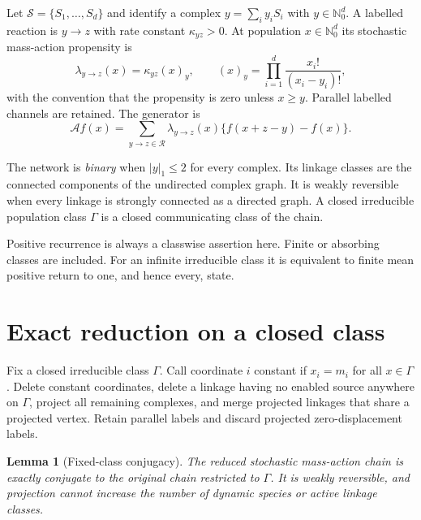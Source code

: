 \documentclass[11pt]{article}
\newtheorem{lemma}[theorem]{Lemma}
\theoremstyle{definition}
\theoremstyle{remark}
\newcommand{\N}{\mathbb N_0}
\newcommand{\cA}{\mathcal A}
\newcommand{\cR}{\mathcal R}
\newcommand{\cS}{\mathcal S}
\newcommand{\1}{\mathbf 1}
\begin{document}
Let $\cS=\{S_1,\ldots,S_d\}$ and identify a complex
$y=\sum_i y_iS_i$ with $y\in\N^d$.  A labelled reaction is $y\to z$ with
rate constant $\kappa_{yz}>0$.  At population $x\in\N^d$ its stochastic
mass-action propensity is
\begin{equation}\label{eq:propensity}
 \lambda_{y\to z}(x)=\kappa_{yz}(x)_y,
 \qquad
 (x)_y=\prod_{i=1}^d\frac{x_i!}{(x_i-y_i)!},
\end{equation}
with the convention that the propensity is zero unless $x\ge y$.
Parallel labelled channels are retained.  The generator is
\begin{equation}\label{eq:generator}
 \cA f(x)=\sum_{y\to z\in\cR}
       \lambda_{y\to z}(x)\{f(x+z-y)-f(x)\}.
\end{equation}

The network is \emph{binary} when $|y|_1\le2$ for every complex.  Its
linkage classes are the connected components of the undirected complex graph.
It is weakly reversible when every linkage is strongly connected as a
directed graph.  A closed irreducible population class $\Gamma$ is a closed
communicating class of the chain.

Positive recurrence is always a classwise assertion here.  Finite or
absorbing classes are included.  For an infinite irreducible class it is
equivalent to finite mean positive return to one, and hence every, state.

\section{Exact reduction on a closed class}

Fix a closed irreducible class $\Gamma$.  Call coordinate $i$ constant if
$x_i=m_i$ for all $x\in\Gamma$.  Delete constant coordinates, delete a
linkage having no enabled source anywhere on $\Gamma$, project all remaining
complexes, and merge projected linkages that share a projected vertex.
Retain parallel labels and discard projected zero-displacement labels.

\begin{lemma}[Fixed-class conjugacy]\label{lem:projection}
The reduced stochastic mass-action chain is exactly conjugate to the original
chain restricted to $\Gamma$.  It is weakly reversible, and projection cannot
increase the number of dynamic species or active linkage classes.
\end{lemma}
\end{document}

